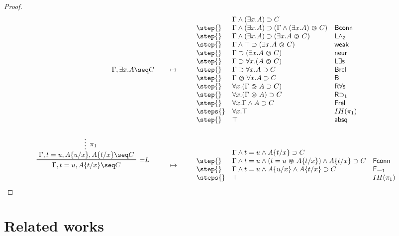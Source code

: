 \begin{proof}
\begin{align*}
      {\Gamma, \exists x. A \seq C}
    &\mt
    \begin{array}{lll}
            & \Gamma \land (\exists x. A) \limp C & \\
      \step{} & \Gamma \land (\exists x. A) \limp (\Gamma \land (\exists x. A) \back C) & \mathsf{Bconn} \\
      \step{} & \Gamma \land (\exists x. A) \limp (\exists x. A \back C) & \mathsf{L\land_2} \\
      \step{} & \Gamma \land \top \limp (\exists x. A \back C) & \mathsf{weak} \\
      \step{} & \Gamma \limp (\exists x. A \back C) & \mathsf{neur} \\
      \step{} & \Gamma \limp \forall x. (A \back C) & \mathsf{L\exists s} \\
      \step{} & \Gamma \limp \forall x. A \limp C & \mathsf{Brel} \\
      \step{} & \Gamma \back \forall x. A \limp C & \mathsf{B} \\
      \step{} & \forall x. (\Gamma \back A \limp C) & \mathsf{R\forall s} \\
      \step{} & \forall x. (\Gamma \forw A) \limp C & \mathsf{R{\limp}_1} \\
      \step{} & \forall x. \Gamma \land A \limp C & \mathsf{Frel} \\
      \steps{} & \forall x. \top & IH(\pi_1) \\
      \step{} & \top & \mathsf{absq}
    \end{array}
    \\\\
    \R[{=}L]
      {\summ[$\pi_1$]{\Gamma, t = u, \subst{A}{u}{x}, \subst{A}{t}{x} \seq C}}
      {\Gamma, t = u, \subst{A}{t}{x} \seq C}
    &\mt
    \begin{array}{lll}
            & \Gamma \land t = u \land \subst{A}{t}{x} \limp C & \\
      \step{} & \Gamma \land t = u \land (t = u \forw \subst{A}{t}{x}) \land \subst{A}{t}{x} \limp C & \mathsf{Fconn} \\
      \step{} & \Gamma \land t = u \land \subst{A}{u}{x} \land \subst{A}{t}{x} \limp C & \mathsf{F{=}_1} \\
      \steps{} & \top & IH(\pi_1)
    \end{array}
  \end{align*}
\end{proof}

\section{Related works}

